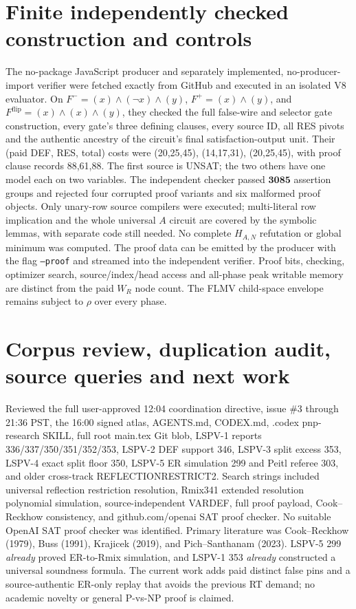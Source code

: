 \documentclass[11pt]{article}
\begin{document}
\section*{Finite independently checked construction and controls}
The no-package JavaScript producer and separately implemented, no-producer-import verifier were fetched exactly from GitHub and executed in an isolated V8 evaluator. On \(F^-=(x)\land(\neg x)\land(y)\), \(F^+=(x)\land(y)\), and \(F^{\mathrm{flip}}=(x)\land(x)\land(y)\), they checked the full false-wire and selector gate construction, every gate's three defining clauses, every source ID, all RES pivots and the authentic ancestry of the circuit's final satisfaction-output unit. Their (paid DEF, RES, total) costs were (20,25,45), (14,17,31), (20,25,45), with proof clause records 88,61,88. The first source is UNSAT; the two others have one model each on two variables. The independent checker passed \(\mathbf{3085}\) assertion groups and rejected four corrupted proof variants and six malformed proof objects. Only unary-row source compilers were executed; multi-literal row implication and the whole universal \(A\) circuit are covered by the symbolic lemmas, with separate code still needed. No complete \(H_{A,N}\) refutation or global minimum was computed. The proof data can be emitted by the producer with the flag \texttt{--proof} and streamed into the independent verifier. Proof bits, checking, optimizer search, source/index/head access and all-phase peak writable memory are distinct from the paid \(W_R\) node count. The FLMV child-space envelope remains subject to \(\rho\) over every phase.

\section*{Corpus review, duplication audit, source queries and next work}
Reviewed the full user-approved 12:04 coordination directive, issue \#3 through 21:36 PST, the 16:00 signed atlas, AGENTS.md, CODEX.md, .codex pnp-research SKILL, full root main.tex Git blob, LSPV-1 reports 336/337/350/351/352/353, LSPV-2 DEF support 346, LSPV-3 split excess 353, LSPV-4 exact split floor 350, LSPV-5 ER simulation 299 and Peitl referee 303, and older cross-track REFLECTIONRESTRICT2. Search strings included universal reflection restriction resolution, Rmix341 extended resolution polynomial simulation, source-independent VARDEF, full proof payload, Cook--Reckhow consistency, and github.com/openai SAT proof checker. No suitable OpenAI SAT proof checker was identified. Primary literature was Cook--Reckhow (1979), Buss (1991), Krajicek (2019), and Pich--Santhanam (2023). LSPV-5 299 \emph{already} proved ER-to-Rmix simulation, and LSPV-1 353 \emph{already} constructed a universal soundness formula. The current work adds paid distinct false pins and a source-authentic ER-only replay that avoids the previous RT demand; no academic novelty or general P-vs-NP proof is claimed.
\end{document}
